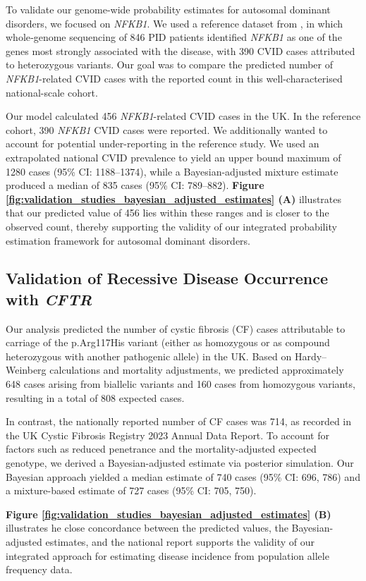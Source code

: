 To validate our genome-wide probability estimates for autosomal dominant disorders, we focused on \textit{NFKB1}. We used a reference dataset from \citet{tuijnenburgNFKB12018}, in which whole‐genome sequencing of 846 PID patients identified \textit{NFKB1} as one of the genes most strongly associated with the disease, with 390 CVID cases attributed to heterozygous variants. Our goal was to compare the predicted number of \textit{NFKB1}-related CVID cases with the reported count in this well-characterised national-scale cohort.

Our model calculated 456 \textit{NFKB1}-related CVID cases in the UK. In the reference cohort,  390  \textit{NFKB1} CVID cases were reported. 
We additionally wanted to account for potential under-reporting in the reference study.
We used an extrapolated national CVID prevalence to yield an upper bound maximum of 1280 cases (95\% CI: 1188–1374), while a Bayesian-adjusted mixture estimate produced a median of 835 cases (95\% CI: 789–882). 
\textbf{Figure \ref{fig:validation_studies_bayesian_adjusted_estimates} (A)}
illustrates that our predicted value of 456 lies within these ranges and is closer to the observed count, thereby supporting the validity of our integrated probability estimation framework for autosomal dominant disorders.

\subsection{Validation of Recessive Disease Occurrence with \textit{CFTR}}

Our analysis predicted the number of cystic fibrosis (CF) cases attributable to carriage of the p.Arg117His variant (either as homozygous or as compound heterozygous with another pathogenic allele) in the UK. Based on Hardy–Weinberg calculations and mortality adjustments, we predicted approximately 648 cases arising from biallelic variants and 160 cases from homozygous variants, resulting in a total of 808 expected cases.

In contrast, the nationally reported number of CF cases was 714, as recorded in the UK Cystic Fibrosis Registry 2023 Annual Data Report. To account for factors such as reduced penetrance and the mortality-adjusted expected genotype, we derived a Bayesian-adjusted estimate via posterior simulation. Our Bayesian approach yielded a median estimate of 740 cases (95\% CI: 696, 786) and a mixture-based estimate of 727 cases (95\% CI: 705, 750).

\textbf{Figure \ref{fig:validation_studies_bayesian_adjusted_estimates} (B)} illustrates he close concordance between the predicted values, the Bayesian-adjusted estimates, and the national report supports the validity of our integrated approach for estimating disease incidence from population allele frequency data.

